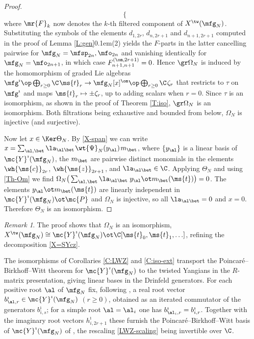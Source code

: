\documentclass{amsart}
\numberwithin{equation}{section}
\theoremstyle{remark}
\newtheorem{remark}[theorem]{Remark}
\renewcommand{\,}{\kern 0.1em} %
\begin{document}
\begin{proof}
\[\begin{cases}
\end{cases}
\]
where $\mr{F}_k$ now denotes the $k$-th filtered component of $X^{\tw}(\mfg_N)$. Substituting the symbols of the elements $d_{1,2r}$, $d_{n,2r+1}$ and $d_{n+1,2r+1}$ computed in the proof of Lemma \ref{L:gen}\,(2) yields
%
\equ{
\bar{\ms{c}}_{2r} \mapsto \theta\, \zeta_{2r} + 2\ga^{(2r)}_{11} , \qq
\bar{\ms{z}}_{2r+1} \mapsto \pm \zeta_{2r+1} ,
\label{cz-symb}
}
%
the $F$-parts in the latter cancelling pairwise for $\mfg_N = \mfsp_{2n}, \mfo_{2n}$ and vanishing identically for $\mfg_N = \mfo_{2n+1}$, in which case $F^{(\om,2r+1)}_{n+1,n+1} = 0$. Hence $\gr \Omega_N$ is induced by the homomorphism of graded Lie algebras
$\mfg^{\imath} \op \bigoplus_{r\ge0} \C\, \ms{t}_r \to \mfg_N[x]^{\om} \op \bigoplus_{r\ge0} \C\, \zeta_r$
that restricts to $\tau$ on $\mfg^{\imath}$ and maps $\ms{t}_r \mapsto \pm\zeta_r$, up to adding scalars when $r=0$. Since $\tau$ is an isomorphism, as shown in the proof of Theorem \ref{T:iso}, $\gr\Omega_N$ is an isomorphism. Both filtrations being exhaustive and bounded from below, $\Omega_N$ is injective (and surjective).

Now let $x \in \Ker \Theta_N$. By \eqref{X-span} we can write $x = \sum_{\al,\bet} \la_{\al\bet}\, \wt{\Psi}_N(y_\al)\, m_\bet$, where $\{y_\al\}$ is a linear basis of $\mc{Y}^{\imath}(\mfg_N)$, the $m_\bet$ are pairwise distinct monomials in the elements $\wh{\ms{c}}_{2r}$, $\wh{\ms{z}}_{2r+1}$, and $\la_{\al\bet} \in \C$. Applying $\Theta_N$ and using \eqref{Th-Om} we find $\Omega_N\big( \sum_{\al,\bet} \la_{\al\bet}\; y_\al \ot m_\bet(\ms{t}) \big) = 0$. The elements $y_\al \ot m_\bet(\ms{t})$ are linearly independent in $\mc{Y}^{\imath}(\mfg_N) \ot \mc{P}$ and $\Omega_N$ is injective, so all $\la_{\al\bet} = 0$ and $x = 0$. Therefore $\Theta_N$ is an isomorphism.
%
\end{proof}


\begin{remark} \label{R:Omega}
%
The proof shows that $\Omega_N$ is an isomorphism, $X^{\tw}(\mfg_N) \cong \mc{Y}^{\imath}(\mfg_N) \ot \C[\ms{t}_0, \ms{t}_1, \ldots]$, refining the decomposition \eqref{X=SYcz}.
%
\end{remark}

The isomorphisms of Corollaries \ref{C:LWZ} and \ref{C:iso-ext} transport the Poincar\'e--Birkhoff--Witt theorem for $\mc{Y}^{\imath}(\mfg_N)$ to the twisted Yangians in the $R$-matrix presentation, giving linear bases in the Drinfeld generators. For each positive root $\al$ of $\mfg_N$ fix, following \cite[\S4.2]{LWZ25b}, a real root vector $b^{\imath}_{\al,r}\in\mc{Y}^{\imath}(\mfg_N)$ $(r\ge0)$, obtained as an iterated commutator of the generators $b^{\imath}_{i,s}$; for a simple root $\al=\al_i$ one has $b^{\imath}_{\al_i,r}=b^{\imath}_{i,r}$. Together with the imaginary root vectors $h^{\imath}_{i,2r+1}$ these furnish the Poincar\'e--Birkhoff--Witt basis of $\mc{Y}^{\imath}(\mfg_N)$ of \cite[Thm.~4.12]{LWZ25b}, the rescaling \eqref{LWZ-scaling} being invertible over $\C$.
\end{document}
